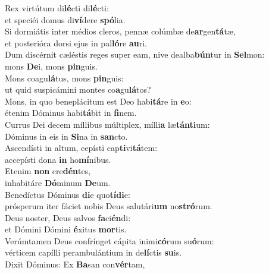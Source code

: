 \oddverse Rex virtútum di\textbf{lé}cti di\textbf{lé}cti:~\*\\
\oddverse et speciéi domus di\textbf{ví}dere \textbf{spó}lia.\\
\evenverse Si dormiátis inter médios cleros, pennæ colúmbæ de\textbf{ar}gen\textbf{tá}tæ,~\*\\
\evenverse et posterióra dorsi ejus in pal\textbf{ló}re \textbf{au}ri.\\
\oddverse Dum discérnit cæléstis reges super eam, nive dealba\textbf{bún}tur in \textbf{Sel}mon:~\*\\
\oddverse mons \textbf{De}i, mons \textbf{pin}guis.\\
\evenverse Mons coagu\textbf{lá}tus, mons \textbf{pin}guis:~\*\\
\evenverse ut quid suspicámini montes co\textbf{a}gu\textbf{lá}tos?\\
\oddverse Mons, in quo beneplácitum est Deo habi\textbf{tá}re in \textbf{e}o:~\*\\
\oddverse étenim Dóminus habi\textbf{tá}bit in \textbf{fi}nem.\\
\evenverse Currus Dei decem míllibus múltiplex, mílli\textbf{a} læ\textbf{tán}\textbf{ti}um:~\*\\
\evenverse Dóminus in eis in \textbf{Si}na in \textbf{san}cto.\\
\oddverse Ascendísti in altum, cepísti cap\textbf{ti}vi\textbf{tá}tem:~\*\\
\oddverse accepísti dona \textbf{in} ho\textbf{mí}nibus.\\
\evenverse Etenim \textbf{non} cre\textbf{dén}tes,~\*\\
\evenverse inhabitáre \textbf{Dó}minum \textbf{De}um.\\
\oddverse Benedíctus Dóminus \textbf{di}e quo\textbf{tí}\textbf{di}e:~\*\\
\oddverse prósperum iter fáciet nobis Deus salutári\textbf{um} no\textbf{stró}rum.\\
\evenverse Deus noster, Deus salvos \textbf{fa}ci\textbf{én}di:~\*\\
\evenverse et Dómini Dómini \textbf{é}xitus \textbf{mor}tis.\\
\oddverse Verúmtamen Deus confrínget cápita inimi\textbf{có}rum su\textbf{ó}rum:~\*\\
\oddverse vérticem capílli perambulántium in de\textbf{lí}ctis \textbf{su}is.\\
\evenverse Dixit Dóminus: Ex \textbf{Ba}san con\textbf{vér}tam,~\*\\
